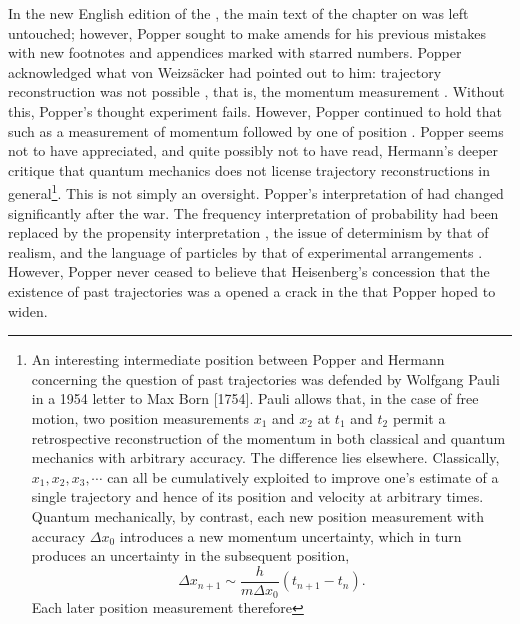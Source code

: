 \documentclass[pdflatex]{sn-jnl}
\newcommand{\me}{; emph.~added{}}
\newcommand{\Lo}{\bt{Logik}\xspace}
\newcommand{\TE}{thought experiment\xspace}
\newcommand{\vW}{von Weizsäcker\xspace}
\newcommand{\fnstar}[1]{\fn{\mbox{\textsuperscript{*}#1}}}
\begin{document}
In the new English edition of the \Lo, the main text of the chapter on \qm was left untouched; however, Popper sought to make amends for his previous mistakes with new footnotes and appendices marked with starred numbers. Popper acknowledged what \vW had pointed out to him: trajectory reconstruction was not possible , that is, the momentum measurement \citep[242\fnstar{3}\me]{Popper1959}. Without this, Popper's \TE fails. However, Popper continued to hold that  such as a measurement of momentum followed by one of position \citep[242\fnstar{3}\me]{Popper1959}. Popper seems not to have appreciated, and quite possibly not to have read, Hermann's deeper critique that quantum mechanics does not license trajectory reconstructions in general\footnote{An interesting intermediate position between Popper and Hermann concerning the question of past trajectories was defended by Wolfgang Pauli in a 1954 letter to Max Born [1754]. Pauli allows that, in the case of free motion, two position measurements $x_1$ and $x_2$ at $t_1$ and $t_2$ permit a retrospective reconstruction of the momentum in both classical and quantum mechanics with arbitrary accuracy. The difference lies elsewhere. Classically, $x_1, x_2, x_3, \cdots$ can all be cumulatively exploited to improve one's estimate of a single trajectory and hence of its position and velocity at arbitrary times. Quantum mechanically, by contrast, each new position measurement with accuracy $\Delta x_0$ introduces a new momentum uncertainty, which in turn produces an uncertainty in the subsequent position,
\[
\Delta x_{n+1} \sim \frac{h}{m \Delta x_0}\left(t_{n+1}-t_n\right).
\]
%
Each later position measurement therefore }. This is not simply an oversight. Popper’s interpretation of \qm had changed significantly after the war. The frequency interpretation of probability had been replaced by the propensity interpretation \citep{Popper1957,Popper1959}, the issue of determinism by that of realism, and the language of particles by that of experimental arrangements \citep{Howard2012}. However, Popper never ceased to believe that Heisenberg’s concession that the existence of past trajectories was a  opened a crack in the  that Popper hoped to widen.
\end{document}
